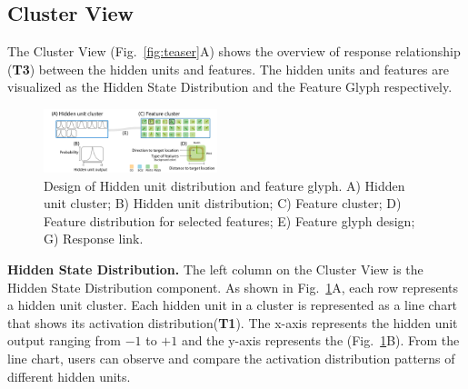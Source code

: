 \subsection{Cluster View}

The Cluster View (Fig.~\ref{fig:teaser}A) shows the overview of response relationship (\textbf{T3}) between the hidden units and features. The hidden units and features are visualized as the Hidden State Distribution and the Feature Glyph respectively.


\begin{figure}[t]
	\centering
    \includegraphics[width=0.45\textwidth]{pictures/design/cluster_design.pdf}
	\vspace{-3mm}
	\caption{Design of Hidden unit distribution and feature glyph. A) Hidden unit cluster; B) Hidden unit distribution; C) Feature cluster; D) Feature distribution for selected features; E) Feature glyph design; G) Response link.}
	\label{fig:cluster_design}
	\vspace{-4mm}
\end{figure}


\textbf{Hidden State Distribution.}
The left column on the Cluster View is the Hidden State Distribution component.
As shown in Fig.~\ref{fig:cluster_design}A, each row represents a hidden unit cluster.
Each hidden unit in a cluster is represented as a line chart that shows its activation distribution(\textbf{T1}).
The x-axis represents the hidden unit output ranging from $-1$ to $+1$ and the y-axis represents the  (Fig.~\ref{fig:cluster_design}B).
From the line chart, users can observe and compare the activation distribution patterns of different hidden units. 

